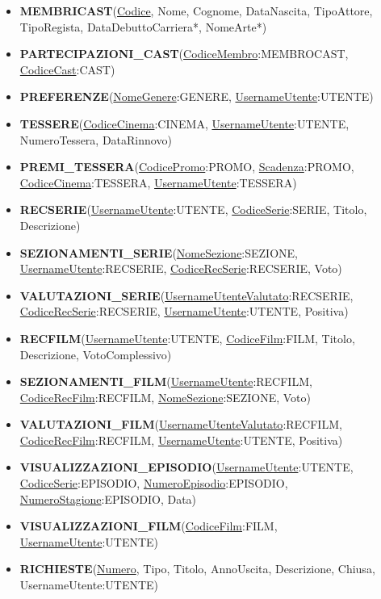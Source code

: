 \documentclass[a4paper,12pt]{report}
\begin{document}
\begin{itemize}
	\item \textbf{MEMBRICAST}(\underline{Codice}, Nome, Cognome, DataNascita, TipoAttore, TipoRegista, DataDebuttoCarriera*, NomeArte*)
	\item \textbf{PARTECIPAZIONI{\_}CAST}(\underline{CodiceMembro}:MEMBROCAST, \underline{CodiceCast}:CAST)
	
	\item \textbf{PREFERENZE}(\underline{NomeGenere}:GENERE, \underline{UsernameUtente}:UTENTE)
	
	\item \textbf{TESSERE}(\underline{CodiceCinema}:CINEMA, \underline{UsernameUtente}:UTENTE, NumeroTessera, DataRinnovo)
	\item \textbf{PREMI{\_}TESSERA}(\underline{CodicePromo}:PROMO, \underline{Scadenza}:PROMO, \underline{CodiceCinema}:TESSERA, \underline{UsernameUtente}:TESSERA)
	
	\item \textbf{RECSERIE}(\underline{UsernameUtente}:UTENTE, \underline{CodiceSerie}:SERIE, Titolo, Descrizione)
	\item \textbf{SEZIONAMENTI{\_}SERIE}(\underline{NomeSezione}:SEZIONE, \underline{UsernameUtente}:RECSERIE, \underline{CodiceRecSerie}:RECSERIE, Voto)
	\item \textbf{VALUTAZIONI{\_}SERIE}(\underline{UsernameUtenteValutato}:RECSERIE, \underline{CodiceRecSerie}:RECSERIE, \underline{UsernameUtente}:UTENTE, Positiva)
	
	\item \textbf{RECFILM}(\underline{UsernameUtente}:UTENTE, \underline{CodiceFilm}:FILM, Titolo, Descrizione, VotoComplessivo)
	\item \textbf{SEZIONAMENTI{\_}FILM}(\underline{UsernameUtente}:RECFILM, \underline{CodiceRecFilm}:RECFILM, \underline{NomeSezione}:SEZIONE, Voto)
	\item \textbf{VALUTAZIONI{\_}FILM}(\underline{UsernameUtenteValutato}:RECFILM, \underline{CodiceRecFilm}:RECFILM, \underline{UsernameUtente}:UTENTE, Positiva)
	
	\item \textbf{VISUALIZZAZIONI{\_}EPISODIO}(\underline{UsernameUtente}:UTENTE, \underline{CodiceSerie}:EPISODIO, \underline{NumeroEpisodio}:EPISODIO, \underline{NumeroStagione}:EPISODIO, Data)
	\item \textbf{VISUALIZZAZIONI{\_}FILM}(\underline{CodiceFilm}:FILM, \underline{UsernameUtente}:UTENTE)
	
	\item \textbf{RICHIESTE}(\underline{Numero}, Tipo, Titolo, AnnoUscita, Descrizione, Chiusa, UsernameUtente:UTENTE)
\end{itemize}
\end{document}
